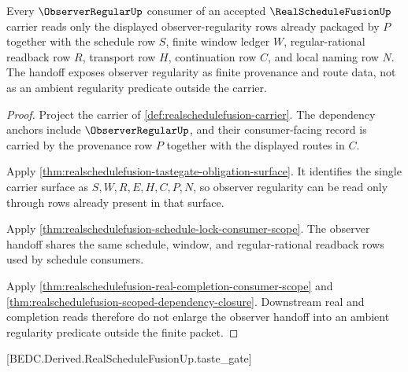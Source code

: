 \begin{theorem}
\label{thm:realschedulefusion-observer-regular-handoff}
Every $\ObserverRegularUp$ consumer of an accepted $\RealScheduleFusionUp$ carrier reads only the displayed observer-regularity rows already packaged by $P$ together with the schedule row $S$, finite window ledger $W$, regular-rational readback row $R$, transport row $H$, continuation row $C$, and local naming row $N$. The handoff exposes observer regularity as finite provenance and route data, not as an ambient regularity predicate outside the carrier.
\end{theorem}
\begin{proof}
Project the carrier of \autoref{def:realschedulefusion-carrier}. The dependency anchors include $\ObserverRegularUp$, and their consumer-facing record is carried by the provenance row $P$ together with the displayed routes in $C$.

Apply \autoref{thm:realschedulefusion-tastegate-obligation-surface}. It identifies the single carrier surface as $S,W,R,E,H,C,P,N$, so observer regularity can be read only through rows already present in that surface.

Apply \autoref{thm:realschedulefusion-schedule-lock-consumer-scope}. The observer handoff shares the same schedule, window, and regular-rational readback rows used by schedule consumers.

Apply \autoref{thm:realschedulefusion-real-completion-consumer-scope} and \autoref{thm:realschedulefusion-scoped-dependency-closure}. Downstream real and completion reads therefore do not enlarge the observer handoff into an ambient regularity predicate outside the finite packet.
\end{proof}

[BEDC.Derived.RealScheduleFusionUp.taste\_gate]

